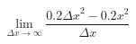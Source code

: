 \documentclass[preview]{standalone}
\begin{document}
\begin{center}
$$\lim_{\Delta x \to \infty}\frac{0.2 {\Delta x}^2 - 0.2x^2}{\Delta x}$$
\end{center}
\end{document}
